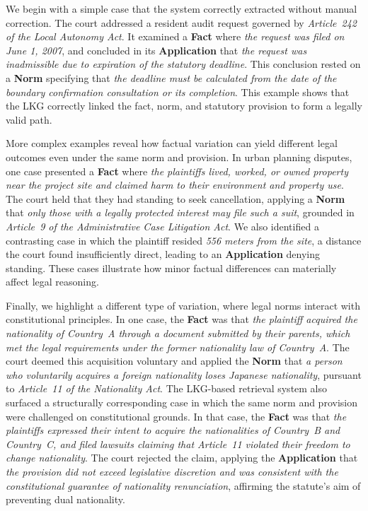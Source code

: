 \documentclass[11pt]{article}
\begin{document}

We begin with a simple case that the system correctly extracted without manual correction. The court addressed a resident audit request governed by \emph{Article~242 of the Local Autonomy Act}. It examined a \textbf{Fact} where \emph{the request was filed on June 1, 2007}, and concluded in its \textbf{Application} that \emph{the request was inadmissible due to expiration of the statutory deadline}. This conclusion rested on a \textbf{Norm} specifying that \emph{the deadline must be calculated from the date of the boundary confirmation consultation or its completion}. This example shows that the LKG correctly linked the fact, norm, and statutory provision to form a legally valid path.



More complex examples reveal how factual variation can yield different legal outcomes even under the same norm and provision. In urban planning disputes, one case presented a \textbf{Fact} where \emph{the plaintiffs lived, worked, or owned property near the project site and claimed harm to their environment and property use}. The court held that they had standing to seek cancellation, applying a \textbf{Norm} that \emph{only those with a legally protected interest may file such a suit}, grounded in \emph{Article~9 of the Administrative Case Litigation Act}.
We also identified a contrasting case in which the plaintiff resided \emph{556 meters from the site}, a distance the court found insufficiently direct, leading to an \textbf{Application} denying standing. These cases illustrate how minor factual differences can materially affect legal reasoning.



Finally, we highlight a different type of variation, where legal norms interact with constitutional principles. In one case, the \textbf{Fact} was that \emph{the plaintiff acquired the nationality of Country~A through a document submitted by their parents, which met the legal requirements under the former nationality law of Country~A}. The court deemed this acquisition voluntary and applied the \textbf{Norm} that \emph{a person who voluntarily acquires a foreign nationality loses Japanese nationality}, pursuant to \emph{Article~11 of the Nationality Act}. 
The LKG-based retrieval system also surfaced a structurally corresponding case in which the same norm and provision were challenged on constitutional grounds. In that case, the \textbf{Fact} was that \emph{the plaintiffs expressed their intent to acquire the nationalities of Country~B and Country~C, and filed lawsuits claiming that Article~11 violated their freedom to change nationality}. The court rejected the claim, applying the \textbf{Application} that \emph{the provision did not exceed legislative discretion and was consistent with the constitutional guarantee of nationality renunciation}, affirming the statute’s aim of preventing dual nationality.
\end{document}
